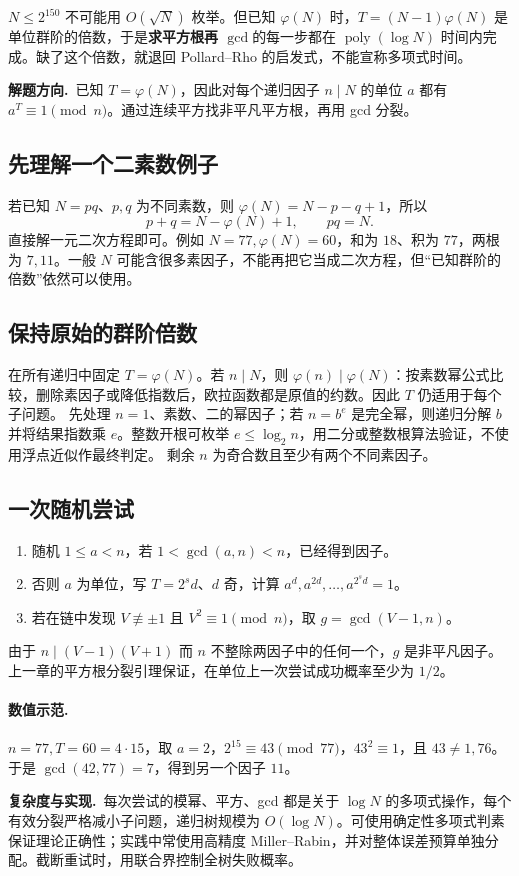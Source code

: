 \documentclass[UTF8,a4paper,11pt,twoside,openright,fontset=fandol]{ctexbook}
\theoremstyle{definition}
\newcommand{\hint}{\par\noindent\textbf{解题方向.}\ }
\newcommand{\cost}{\par\noindent\textbf{复杂度与实现.}\ }
\begin{document}
\begin{tip}
$N\le2^{150}$ 不可能用 $O(\sqrt N)$ 枚举。但已知 $\varphi(N)$ 时，$T=(N-1)\varphi(N)$ 是单位群阶的倍数，于是\textbf{求平方根再 $\gcd$}的每一步都在 $\operatorname{poly}(\log N)$ 时间内完成。缺了这个倍数，就退回 Pollard--Rho 的启发式，不能宣称多项式时间。
\end{tip}

\hint 已知 $T=\varphi(N)$，因此对每个递归因子 $n\mid N$ 的单位 $a$ 都有 $a^T\equiv1\pmod n$。通过连续平方找非平凡平方根，再用 gcd 分裂。


\subsection{先理解一个二素数例子}
若已知 $N=pq$、$p,q$ 为不同素数，则 $\varphi(N)=N-p-q+1$，所以
\[
 p+q=N-\varphi(N)+1,\qquad pq=N.
\]
直接解一元二次方程即可。例如 $N=77,\varphi(N)=60$，和为 $18$、积为 $77$，两根为 $7,11$。一般 $N$ 可能含很多素因子，不能再把它当成二次方程，但“已知群阶的倍数”依然可以使用。

\subsection{保持原始的群阶倍数}
在所有递归中固定 $T=\varphi(N)$。若 $n\mid N$，则 $\varphi(n)\mid\varphi(N)$：按素数幂公式比较，删除素因子或降低指数后，欧拉函数都是原值的约数。因此 $T$ 仍适用于每个子问题。
先处理 $n=1$、素数、二的幂因子；若 $n=b^e$ 是完全幂，则递归分解 $b$ 并将结果指数乘 $e$。整数开根可枚举 $e\le\log_2n$，用二分或整数根算法验证，不使用浮点近似作最终判定。
剩余 $n$ 为奇合数且至少有两个不同素因子。

\subsection{一次随机尝试}
\begin{enumerate}
\item 随机 $1\le a<n$，若 $1<\gcd(a,n)<n$，已经得到因子。
\item 否则 $a$ 为单位，写 $T=2^sd$、$d$ 奇，计算 $a^d,a^{2d},\ldots,a^{2^sd}=1$。
\item 若在链中发现 $V\not\equiv\pm1$ 且 $V^2\equiv1\pmod n$，取 $g=\gcd(V-1,n)$。
\end{enumerate}
由于 $n\mid(V-1)(V+1)$ 而 $n$ 不整除两因子中的任何一个，$g$ 是非平凡因子。上一章的平方根分裂引理保证，在单位上一次尝试成功概率至少为 $1/2$。

\paragraph{数值示范.} $n=77,T=60=4\cdot15$，取 $a=2$，$2^{15}\equiv43\pmod{77}$，$43^2\equiv1$，且 $43\ne1,76$。于是 $\gcd(42,77)=7$，得到另一个因子 $11$。
\cost 每次尝试的模幂、平方、gcd 都是关于 $\log N$ 的多项式操作，每个有效分裂严格减小子问题，递归树规模为 $O(\log N)$。可使用确定性多项式判素保证理论正确性；实践中常使用高精度 Miller--Rabin，并对整体误差预算单独分配。截断重试时，用联合界控制全树失败概率。
\end{document}
